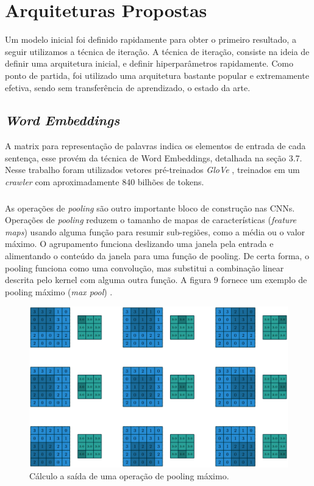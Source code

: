 \documentclass[12pt]{article}
\begin{document}
\section{Arquiteturas Propostas}

Um modelo inicial foi definido rapidamente para obter o primeiro resultado, a seguir utilizamos a técnica de iteração. A técnica de iteração, consiste na ideia de definir uma arquitetura inicial, e definir hiperparâmetros rapidamente. Como ponto de partida, foi utilizado uma arquitetura bastante popular e extremamente efetiva, sendo sem transferência de aprendizado, o estado da arte.

\subsection{\textit{Word Embeddings}}

A matrix para representação de palavras indica os elementos de entrada de cada sentença, esse provém da técnica de Word Embeddings, detalhada na seção 3.7. Nesse trabalho foram utilizados vetores pré-treinados \textit{GloVe} \cite{pennington2014glove}, treinados em um \textit{crawler} com aproximadamente 840 bilhões de tokens.

\subsubsection{}

As operações de \textit{pooling} são outro importante bloco de construção nas CNNs. Operações de \textit{pooling} reduzem o tamanho de mapas de características (\textit{feature maps}) usando alguma função para resumir sub-regiões, como a média ou o valor máximo. O agrupamento funciona deslizando uma janela pela entrada e alimentando o conteúdo da janela para uma função de pooling. De certa forma, o pooling funciona como uma convolução, mas substitui a combinação linear descrita pelo kernel com alguma outra função. A figura 9 fornece um exemplo de pooling máximo (\textit{max pool}) \cite{dumoulin2016guide}.

\begin{figure}[!htb]
\centering
\includegraphics[width=.9\textwidth]{images/pooling.png}
\caption{Cálculo a saída de uma operação de pooling máximo. \cite{dumoulin2016guide}}
\label{fig:graph}
\end{figure}
\end{document}

